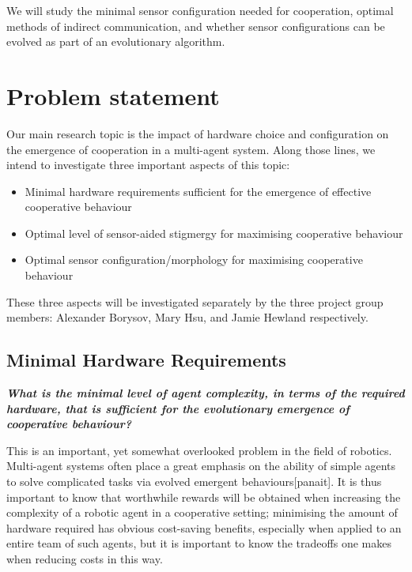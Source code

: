 \documentclass[a4paper,12pt]{article}
\begin{document}
We will study the minimal sensor configuration needed for cooperation, optimal methods of indirect communication, and whether sensor configurations can be evolved as part of an evolutionary algorithm.

\section{Problem statement}
Our main research topic is the impact of hardware choice and configuration on the emergence of cooperation in a multi-agent system. Along those lines, we intend to investigate three important aspects of this topic:

\begin{itemize}
\item Minimal hardware requirements sufficient for the emergence of effective cooperative behaviour
\item Optimal level of sensor-aided stigmergy for maximising cooperative behaviour
\item Optimal sensor configuration/morphology for maximising cooperative behaviour
\end{itemize}

These three aspects will be investigated separately by the three project group members: Alexander Borysov, Mary Hsu, and Jamie Hewland respectively.

\subsection{Minimal Hardware Requirements}

\textbf{ \textit{What is the minimal level of agent complexity, in terms of the required hardware, that is sufficient for the evolutionary emergence of cooperative behaviour?}}

This is an important, yet somewhat overlooked problem in the field of robotics. Multi-agent systems often place a great emphasis on the ability of simple agents to solve complicated tasks via evolved emergent behaviours[panait]. It is thus important to know that worthwhile rewards will be obtained when increasing the complexity of a robotic agent in a cooperative setting; minimising the amount of hardware required has obvious cost-saving benefits, especially when applied to an entire team of such agents, but it is important to know the tradeoffs one makes when reducing costs in this way.
\end{document}
